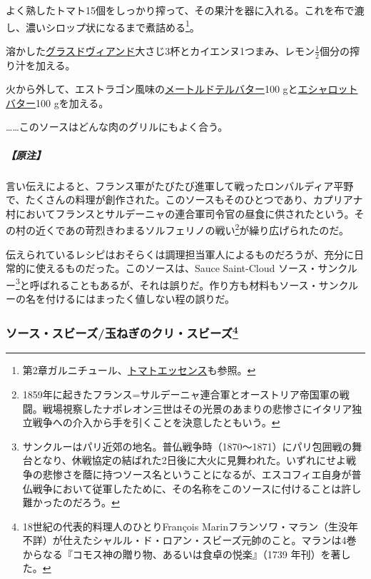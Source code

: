 \begin{recette}


よく熟したトマト15個をしっかり搾って、その果汁を器に入れる。これを布で漉し、濃いシロップ状になるまで煮詰める\footnote{第2章ガルニチュール、\protect\hyperlink{essence-de-tomate}{トマトエッセンス}も参照。}。

溶かした\protect\hyperlink{glace-de-viande}{グラスドヴィアンド}大さじ3杯とカイエンヌ1つまみ、レモン\(\frac{1}{2}\)個分の搾り汁を加える。

火から外して、エストラゴン風味の\protect\hyperlink{beurre-maitre-d-hotel}{メートルドテルバター}100
gと\protect\hyperlink{beurre-d-echalote}{エシャロットバター}100
gを加える。

\ldots{}\ldots{}このソースはどんな肉のグリルにもよく合う。

\hypertarget{nota-sauce-solferino}{%
\subparagraph{【原注】}\label{nota-sauce-solferino}}

言い伝えによると、フランス軍がたびたび進軍して戦ったロンバルディア平野で、たくさんの料理が創作された。このソースもそのひとつであり、カプリアナ村においてフランスとサルデーニャの連合軍司令官の昼食に供されたという。その村の近くであの苛烈きわまるソルフェリノの戦い\footnote{1859年に起きたフランス=サルデーニャ連合軍とオーストリア帝国軍の戦闘。戦場視察したナポレオン三世はその光景のあまりの悲惨さにイタリア独立戦争への介入から手を引くことを決意したともいう。}が繰り広げられたのだ。

伝えられているレシピはおそらくは調理担当軍人によるものだろうが、充分に日常的に使えるものだった。このソースは、Sauce
Saint-Cloud ソース・サンクルー\footnote{サンクルーはパリ近郊の地名。普仏戦争時（1870〜1871）にパリ包囲戦の舞台となり、休戦協定の結ばれた2日後に大火に見舞われた。いずれにせよ戦争の悲惨さを蔭に持つソース名ということになるが、エスコフィエ自身が普仏戦争において従軍したために、その名称をこのソースに付けることは許し難かったのだろう。}と呼ばれることもあるが、それは誤りだ。作り方も材料もソース・サンクルーの名を付けるにはまったく値しない程の誤りだ。

\hypertarget{sauce-soubise}{%
\subsubsection[ソース・スビーズ/玉ねぎのクリ・スビーズ]{\texorpdfstring{ソース・スビーズ/玉ねぎのクリ・スビーズ\footnote{18世紀の代表的料理人のひとりFrançois
  Marinフランソワ・マラン（生没年不詳）が仕えたシャルル・ド・ロアン・スビーズ元帥のこと。マランは4巻からなる『コモス神の贈り物、あるいは食卓の悦楽』（1739
  年刊）を著した。}}{ソース・スビーズ/玉ねぎのクリ・スビーズ}}\label{sauce-soubise}}


\end{recette}
